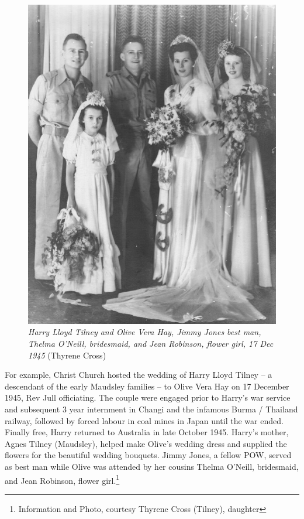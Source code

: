 \begin{figure}
\begin{center}
\includegraphics[width=1.\linewidth,center]{../images/OliveAndSnowTilneyWedding17121945.jpg}
\caption{{\itshape Harry Lloyd Tilney and Olive Vera Hay, Jimmy Jones best man, Thelma O'Neill, bridesmaid, and Jean Robinson, flower girl, 17 Dec 1945} {\scriptsize(Thyrene Cross)}}
\end{center}
\end{figure}




For example, Christ Church hosted the wedding of Harry Lloyd Tilney -- a descendant of the early Maudsley families -- to Olive Vera Hay on 17 December 1945, Rev Jull officiating. The couple were engaged prior to Harry's war service and subsequent 3  year internment in Changi and the infamous Burma / Thailand railway, followed by forced labour in coal mines in Japan until the war ended. Finally free, Harry returned to Australia in late October 1945. Harry's mother, Agnes Tilney (Maudsley), helped make Olive's wedding dress and supplied the flowers for the beautiful wedding bouquets. Jimmy Jones, a fellow POW, served as best man while Olive was attended by her cousins Thelma O'Neill, bridesmaid, and Jean Robinson, flower girl.\footnote{Information and Photo, courtesy Thyrene Cross (Tilney), daughter}


